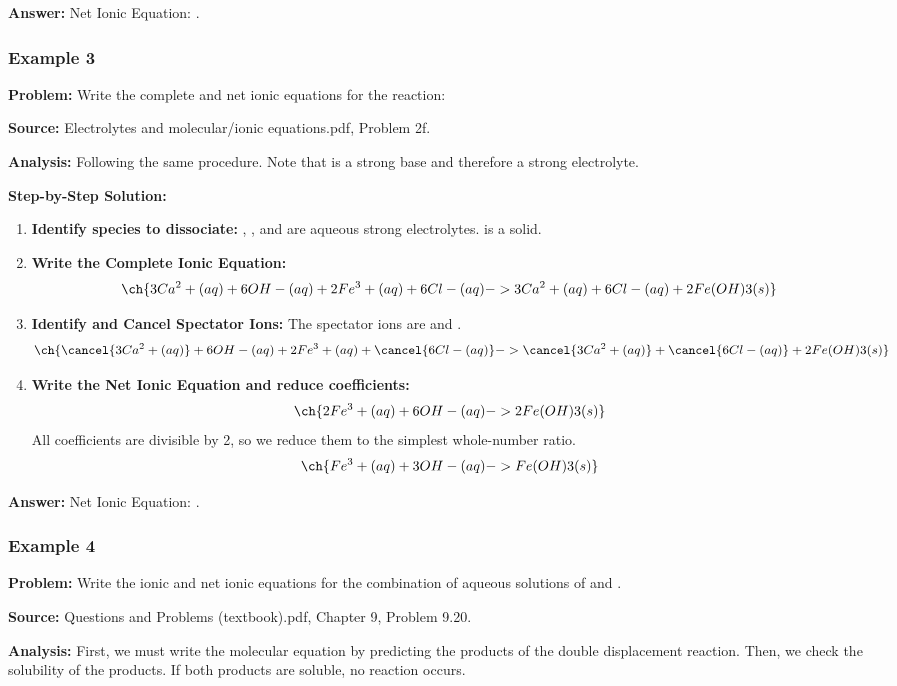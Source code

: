 \documentclass{article}
\begin{document}
\textbf{Answer:} Net Ionic Equation: \textbf{}.

\subsubsection{Example 3}
\textbf{Problem:} Write the complete and net ionic equations for the reaction: 

\textbf{Source:} Electrolytes and molecular/ionic equations.pdf, Problem 2f.

\textbf{Analysis:} Following the same procedure. Note that  is a strong base and therefore a strong electrolyte.

\textbf{Step-by-Step Solution:}
\begin{enumerate}
    \item \textbf{Identify species to dissociate:} , , and  are aqueous strong electrolytes.  is a solid.
    \item \textbf{Write the Complete Ionic Equation:}
    \[ \ch{3Ca^2+(aq) + 6OH-(aq) + 2Fe^3+(aq) + 6Cl-(aq) -> 3Ca^2+(aq) + 6Cl-(aq) + 2Fe(OH)3(s)} \]
    \item \textbf{Identify and Cancel Spectator Ions:} The spectator ions are  and .
    \[ \ch{\cancel{3Ca^2+(aq)} + 6OH-(aq) + 2Fe^3+(aq) + \cancel{6Cl-(aq)} -> \cancel{3Ca^2+(aq)} + \cancel{6Cl-(aq)} + 2Fe(OH)3(s)} \]
    \item \textbf{Write the Net Ionic Equation and reduce coefficients:}
    \[ \ch{2Fe^3+(aq) + 6OH-(aq) -> 2Fe(OH)3(s)} \]
    All coefficients are divisible by 2, so we reduce them to the simplest whole-number ratio.
    \[ \ch{Fe^3+(aq) + 3OH-(aq) -> Fe(OH)3(s)} \]
\end{enumerate}

\textbf{Answer:} Net Ionic Equation: \textbf{}.

\subsubsection{Example 4}
\textbf{Problem:} Write the ionic and net ionic equations for the combination of aqueous solutions of  and .

\textbf{Source:} Questions and Problems (textbook).pdf, Chapter 9, Problem 9.20.

\textbf{Analysis:} First, we must write the molecular equation by predicting the products of the double displacement reaction. Then, we check the solubility of the products. If both products are soluble, no reaction occurs.
\end{document}
